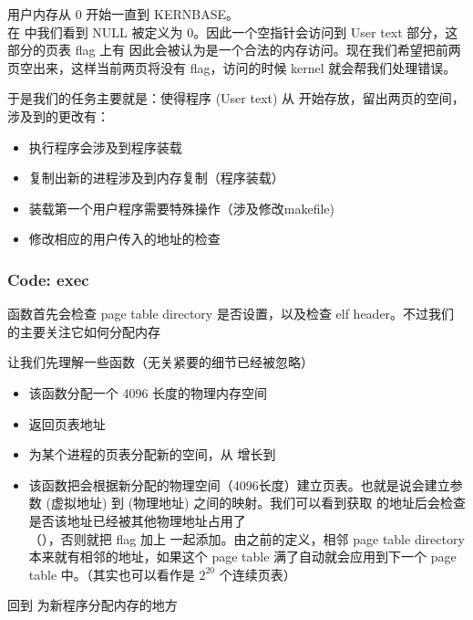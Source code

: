 用户内存从 0 开始一直到 KERNBASE。
\\ 在  中我们看到 NULL 被定义为 0。因此一个空指针会访问到 User text 部分，这部分的页表 flag 上有  因此会被认为是一个合法的内存访问。现在我们希望把前两页空出来，这样当前两页将没有  flag，访问的时候 kernel 就会帮我们处理错误。

于是我们的任务主要就是：使得程序 (User text) 从  开始存放，留出两页的空间，涉及到的更改有：

\begin{itemize}
    \item {} 执行程序会涉及到程序装载
    \item {} 复制出新的进程涉及到内存复制（程序装载）
    \item {} 装载第一个用户程序需要特殊操作（涉及修改makefile)
    \item 修改相应的用户传入的地址的检查
\end{itemize}


\subsubsection{Code: exec}

 函数首先会检查 page table directory 是否设置，以及检查 elf header。不过我们的主要关注它如何分配内存

让我们先理解一些函数（无关紧要的细节已经被忽略）

\begin{itemize}
    \item {} 该函数分配一个 4096 长度的物理内存空间
    \item {} 返回页表地址
    \item {} 为某个进程的页表分配新的空间，从  增长到 
    \item {} 该函数把会根据新分配的物理空间（4096长度）建立页表。也就是说会建立参数  (虚拟地址) 到  (物理地址) 之间的映射。我们可以看到获取  的地址后会检查是否该地址已经被其他物理地址占用了
    \\ （），否则就把 flag 加上  一起添加。由之前的定义，相邻 page table directory 本来就有相邻的地址，如果这个 page table 满了自动就会应用到下一个 page table 中。（其实也可以看作是 $2^{20}$ 个连续页表）
\end{itemize}

回到  为新程序分配内存的地方

